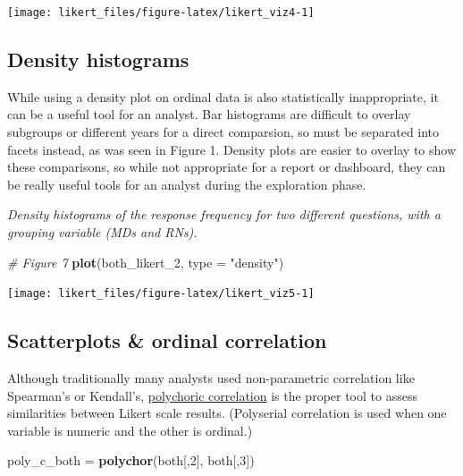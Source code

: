 \documentclass[]{book}
\newenvironment{Shaded}{\begin{snugshade}}{\end{snugshade}}
\newcommand{\KeywordTok}[1]{\textcolor[rgb]{0.13,0.29,0.53}{\textbf{{#1}}}}
\newcommand{\DataTypeTok}[1]{\textcolor[rgb]{0.13,0.29,0.53}{{#1}}}
\newcommand{\DecValTok}[1]{\textcolor[rgb]{0.00,0.00,0.81}{{#1}}}
\newcommand{\StringTok}[1]{\textcolor[rgb]{0.31,0.60,0.02}{{#1}}}
\newcommand{\CommentTok}[1]{\textcolor[rgb]{0.56,0.35,0.01}{\textit{{#1}}}}
\newcommand{\NormalTok}[1]{{#1}}
\begin{document}
\begin{center}\texttt{[image: likert\_files/figure-latex/likert\_viz4-1]} \end{center}

\subsection{Density histograms}\label{density-histograms}

While using a density plot on ordinal data is also statistically
inappropriate, it can be a useful tool for an analyst. Bar histograms
are difficult to overlay subgroups or different years for a direct
comparsion, so must be separated into facets instead, as was seen in
Figure 1. Density plots are easier to overlay to show these comparisons,
so while not appropriate for a report or dashboard, they can be really
useful tools for an analyst during the exploration phase.

\emph{Density histograms of the response frequency for two different
questions, with a grouping variable (MDs and RNs).}

\begin{Shaded}
\begin{Highlighting}[]
\CommentTok{# Figure 7}
\KeywordTok{plot}\NormalTok{(both_likert_2, }\DataTypeTok{type =} \StringTok{"density"}\NormalTok{)}
\end{Highlighting}
\end{Shaded}

\begin{center}\texttt{[image: likert\_files/figure-latex/likert\_viz5-1]} \end{center}

\subsection{Scatterplots \& ordinal
correlation}\label{scatterplots-ordinal-correlation}

Although traditionally many analysts used non-parametric correlation
like Spearman's or Kendall's,
\href{https://en.wikipedia.org/wiki/Polychoric_correlation}{polychoric
correlation} is the proper tool to assess similarities between Likert
scale results. (Polyserial correlation is used when one variable is
numeric and the other is ordinal.)

\begin{Shaded}
\begin{Highlighting}[]
\NormalTok{poly_c_both =}\StringTok{ }\KeywordTok{polychor}\NormalTok{(both[,}\DecValTok{2}\NormalTok{], both[,}\DecValTok{3}\NormalTok{])}
\end{Highlighting}
\end{Shaded}
\end{document}
